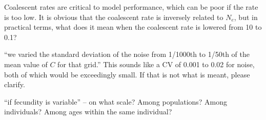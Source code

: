 
\begin{point}{}
    Coalescent rates are critical to model performance, which can be poor if the
    rate is too low.  It is obvious that the coalescent rate is inversely
    related to $N_e$, but in practical terms, what does it mean when the
    coalescent rate is lowered from 10 to 0.1?
\end{point}


\begin{point}{\revref}
    ``we varied the standard deviation of the noise from 1/1000th to 1/50th of
    the mean value of $C$ for that grid.''  This sounds like a CV of 0.001 to
    0.02 for noise, both of which would be exceedingly small.  If that is not
    what is meant, please clarify.
\end{point}


\begin{point}{\revref}
    ``if fecundity is variable'' -- on what scale?  Among populations?  Among
    individuals?  Among ages within the same individual? 
\end{point}


